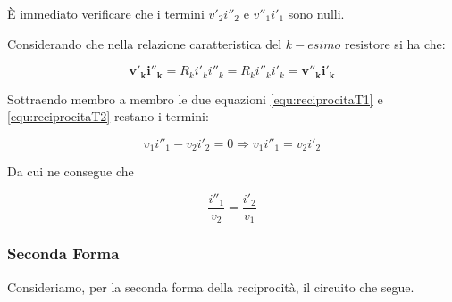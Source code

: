 \documentclass[a4paper]{report}
\begin{document}
\`E immediato verificare che i termini $v'_2i''_2$ e $v''_1i'_1$ sono
nulli.

Considerando che nella relazione caratteristica del $k-esimo$ resistore
si ha che:

\[
\mathbf{v'_ki''_k}=R_ki'_ki''_k=R_ki''_ki'_k=\mathbf{v''_ki'_k}
\]

Sottraendo membro a membro le due equazioni \ref{equ:reciprocitaT1} e
\ref{equ:reciprocitaT2} restano i termini:

\[
v_1i''_1-v_2i'_2=0 \Longrightarrow v_1i''_1=v_2i'_2
\]

Da cui ne consegue che

\[
\dfrac{i''_1}{v_2}=\dfrac{i'_2}{v_1}
\]

\subsubsection{Seconda Forma}
\label{subsec:reciprocita2}

Consideriamo, per la seconda forma della reciprocit\`a, il circuito
che segue.
\end{document}
